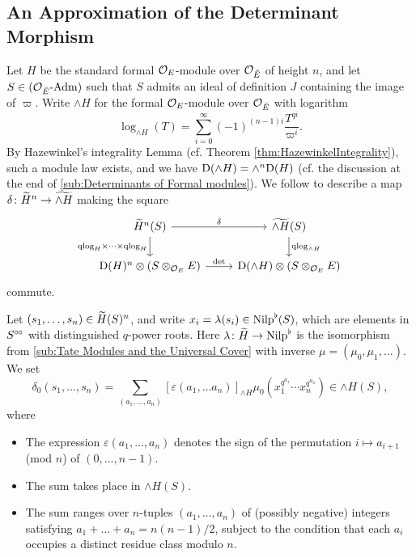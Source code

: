 \documentclass[../main.tex]{subfiles}
\begin{document}
\subsection{An Approximation of the Determinant Morphism} %
\label{sub:Determinants}
Let $H$ be the standard formal $\cO_E$-module over $\cO_{\breve E}$ of height
$n$, and let $S \in \Adm {\cO_{\br E}}$ such that $S$ admits an ideal of definition
$J$ containing the image of $\varpi$. Write $\wedge H$ for the formal
$\cO_E$-module over $\cO_{\breve E}$ with logarithm
\begin{equation*}
  \log_{\wedge H}(T) = \sum_{i = 0}^\infty (-1)^{(n-1)i} \frac{T^{qi}}{\varpi^i}.
\end{equation*}
By Hazewinkel's integrality Lemma (cf. Theorem \ref{thm:HazewinkelIntegrality}), 
such a module law exists, and we have $\Dio(\wedge H) = \wedge^n \Dio(H)$ (cf. 
the discussion at the end of \cref{sub:Determinants of Formal modules}). 
We follow \cite[Theorem 2.10.3]{BoyarchenkoWeinstein2011MaxVar} to describe a
map $\delta\colon \Tilde H^n \to \Tilde {\wedge H}$ making the square
\begin{equation}\label{diag:qlogsquare}
\begin{tikzcd}[ampersand replacement=\&]
	{\Tilde H^n(S)} \& {\Tilde{\wedge H}(S)} \\
	{\Dio(H)^n \otimes (S\otimes_{\cO_E} E)} \& {\Dio(\wedge H) \otimes(S\otimes_{\cO_E}E)}
	\arrow["\delta", from=1-1, to=1-2]
	\arrow["\qlog_H \times \dots \times \qlog_H"', from=1-1, to=2-1]
  \arrow["\qlog_{\wedge H}", from=1-2, to=2-2]
	\arrow["\det", from=2-1, to=2-2]
\end{tikzcd}
\end{equation}
commute. 

Let $(s_1, \dots, s_n) \in \Tilde H(S)^n$, and write $x_i = \lambda(s_i) \in
\Nilp^\flat(S)$, which are elements in $S^\cici$ with distinguished $q$-power
roots. Here $\lambda\colon \Tilde H \to \Nilp^\flat$ is the isomorphism from 
\ref{sub:Tate Modules and the Universal Cover} with inverse $\mu = (\mu_0,
\mu_1, \dots)$. 
We set
\begin{equation*}
  \delta_0(s_1, \dots, s_n) = \sum_{(a_1, \dots, a_n)} [\varepsilon(a_1, \dots
  a_n)]_{\wedge H} \mu_0(x_1^{q^{a_1}} \cdots x_n^{q^{a_n}}) \in \wedge H(S),
\end{equation*}
where 
\begin{itemize}
  \item The expression $\varepsilon(a_1, \dots, a_n)$ denotes the sign of the 
    permutation $i \mapsto a_{i+1}$ (mod $n$) of $(0, \dots, n-1)$.
  \item The sum takes place in ${\wedge H}(S)$.
  \item The sum ranges over $n$-tuples $(a_1, \dots, a_n)$ of (possibly
    negative) integers 
    satisfying $a_1 + \dots + a_n = n (n-1)/2$, subject to the
    condition that each $a_i$ occupies a distinct residue class modulo $n$.
\end{itemize}
\end{document}
